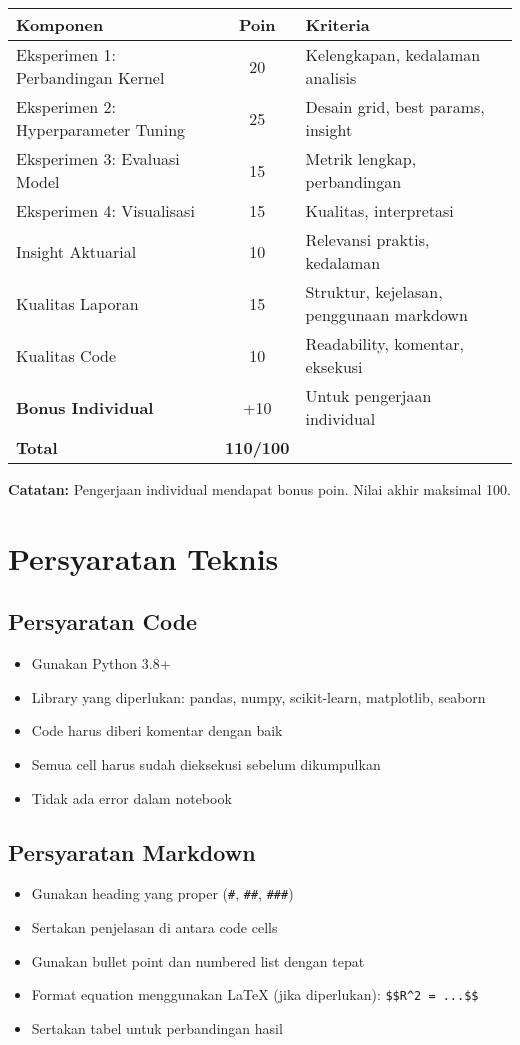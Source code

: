 \documentclass[12pt,a4paper]{article}
\begin{document}
\begin{table}[h]
\centering
\begin{tabular}{@{}p{7cm}cp{6cm}@{}}
\toprule
\textbf{Komponen} & \textbf{Poin} & \textbf{Kriteria} \\ \midrule
Eksperimen 1: Perbandingan Kernel & 20 & Kelengkapan, kedalaman analisis \\
Eksperimen 2: Hyperparameter Tuning & 25 & Desain grid, best params, insight \\
Eksperimen 3: Evaluasi Model & 15 & Metrik lengkap, perbandingan \\
Eksperimen 4: Visualisasi & 15 & Kualitas, interpretasi \\
Insight Aktuarial & 10 & Relevansi praktis, kedalaman \\
Kualitas Laporan & 15 & Struktur, kejelasan, penggunaan markdown \\
Kualitas Code & 10 & Readability, komentar, eksekusi \\
\midrule
\textbf{Bonus Individual} & +10 & Untuk pengerjaan individual \\
\textbf{Total} & \textbf{110/100} & \\ \bottomrule
\end{tabular}
\end{table}

\textbf{Catatan:} Pengerjaan individual mendapat bonus poin. Nilai akhir maksimal 100.

\section{Persyaratan Teknis}

\subsection{Persyaratan Code}
\begin{itemize}
    \item Gunakan Python 3.8+
    \item Library yang diperlukan: pandas, numpy, scikit-learn, matplotlib, seaborn
    \item Code harus diberi komentar dengan baik
    \item Semua cell harus sudah dieksekusi sebelum dikumpulkan
    \item Tidak ada error dalam notebook
\end{itemize}

\subsection{Persyaratan Markdown}
\begin{itemize}
    \item Gunakan heading yang proper (\texttt{\#}, \texttt{\#\#}, \texttt{\#\#\#})
    \item Sertakan penjelasan di antara code cells
    \item Gunakan bullet point dan numbered list dengan tepat
    \item Format equation menggunakan LaTeX (jika diperlukan): \verb|$$R^2 = ...$$|
    \item Sertakan tabel untuk perbandingan hasil
\end{itemize}
\end{document}
